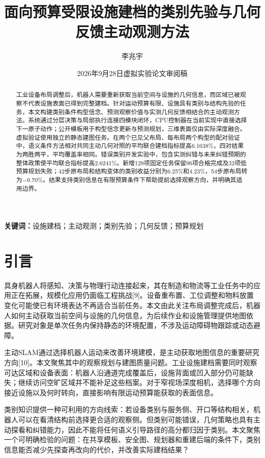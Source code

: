 \documentclass[11pt,a4paper]{article}
\title{\textbf{面向预算受限设施建档的类别先验与几何反馈主动观测方法}}
\author{李兆宇}
\date{2026年9月28日\quad 虚拟实验论文审阅稿}
\begin{document}
\maketitle

\begin{abstract}
工业设备布局调整后，机器人需要重新获取当前空间与设施的几何信息，而区域已被观察不代表设施表面已得到完整建档。针对运动预算有限、设施具有类别与结构先验的任务，本文构建类别条件构型信念、预测观察价值与实测几何反馈相结合的主动观测方法。系统通过分层决策与局部执行连接四模块闭环，CPU控制器在当前实现中直接选择下一原子动作；公开模板用于构型信念更新与预测规划，三维表面仅由实际深度融合。虚拟验证使用独立的静态建图任务。在两个已见父布局、每布局两个构型的配对验证中，语义条件方法相对共同主动几何对照的平均联合建档指标提高6.1638\%，四对结果为两胜两平，平均覆盖率相同。错误类别开发实验中，包含实测纠错与未来纠错预期的整体政策使平均联合指标提高2.6241\%。新增128项固定任务保留96项合格完成及32项低预算规划失败；42步原布局和结构变体的类别收益分别为6.25\%和4.23\%，54步原布局转为−0.70\%。结果支持类别信息在有限预算条件下帮助提前选择观察方向，并明确其适用边界。
\end{abstract}
\noindent\textbf{关键词：}设施建档；主动观测；类别先验；几何反馈；预算规划

\hypertarget{ux5f15ux8a00}{%
\section{引言}\label{ux5f15ux8a00}}

具身机器人将感知、决策与物理行动连接起来，其在制造和物流等工业任务中的应用正在拓展，规模化应用仍面临工程挑战{[}9{]}。设备重布置、工位调整和物料放置变化可能使已有环境表达不再适合当前任务。本文由此关注布局调整完成后，机器人如何主动获取当前空间与设施的几何信息，为后续作业和设施管理提供地图依据。研究对象是单次任务内保持静态的环境配置，不涉及运动障碍物跟踪或动态避障。

主动SLAM通过选择机器人运动来改善环境建模，是主动获取地图信息的重要研究方向{[}10{]}。本文聚焦其中的观察规划与建图质量问题。工业设施建档需要同时观察可达区域和设备表面：机器人沿通道完成覆盖后，设施背面或凹入部分仍可能缺失；继续访问空旷区域并不能补足这些档案。对于窄视场深度相机，选择哪个方向接近设施以及何时转向，直接影响有限运动预算能获取的表面信息。

类别知识提供一种可利用的方向线索：若设备类别与服务侧、开口等结构相关，机器人可以在看清结构前选择更合适的观察侧。但类别可能错误，几何策略也具有主动探看和纠错能力，因此不能将任何语义引导路径的高分都归因于类别。本文聚焦一个可明确检验的问题：在共享模板、安全图、规划器和重建后端的条件下，类别信息能否减少先探查再改向的代价，并改善实际建档结果？
\end{document}
